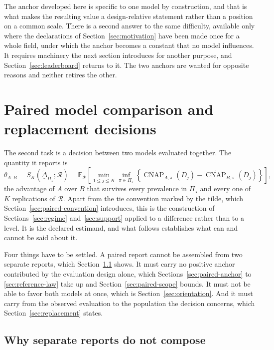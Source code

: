 \documentclass[11pt]{article}
\newcommand{\CNAP}{\operatorname{CNAP}}
\newcommand{\Regime}{\mathcal{R}}
\newcommand{\PSet}{\Pi_\star}
\newcommand{\E}{\mathbb{E}}
\newcommand{\CNAPta}{\widetilde{\CNAP}}
\newcommand{\RobDta}{\underline{\widetilde{\Delta}}_{\PSet}}
\theoremstyle{remark}
\begin{document}
The anchor developed here is specific to one model by construction, and that is what makes the resulting value a design-relative statement rather than a position on a common scale. There is a second answer to the same difficulty, available only where the declarations of Section~\ref{sec:motivation} have been made once for a whole field, under which the anchor becomes a constant that no model influences. It requires machinery the next section introduces for another purpose, and Section~\ref{sec:leaderboard} returns to it. The two anchors are wanted for opposite reasons and neither retires the other.

\section{Paired model comparison and replacement decisions}
\label{sec:paired}

The second task is a decision between two models evaluated together. The quantity it reports is
\begin{equation}
\theta_{A:B}
=
S_K(\RobDta;\Regime)
=
\E_{\Regime}
\left[
\min_{1\leq j\leq K}
\inf_{\pi\in\PSet}
\left\{
\CNAPta_{A,\pi}(D_j)
-
\CNAPta_{B,\pi}(D_j)
\right\}
\right],
\label{eq:robust-paired-support}
\end{equation}
the advantage of $A$ over $B$ that survives every prevalence in $\PSet$ and every one of $K$ replications of $\Regime$. Apart from the tie convention marked by the tilde, which Section~\ref{sec:paired-convention} introduces, this is the construction of Sections~\ref{sec:regime} and~\ref{sec:support} applied to a difference rather than to a level. It is the declared estimand, and what follows establishes what can and cannot be said about it.

Four things have to be settled. A paired report cannot be assembled from two separate reports, which Section~\ref{sec:marginal} shows. It must carry no positive anchor contributed by the evaluation design alone, which Sections~\ref{sec:paired-anchor} to \ref{sec:reference-law} take up and Section~\ref{sec:paired-scope} bounds. It must not be able to favor both models at once, which is Section~\ref{sec:orientation}. And it must carry from the observed evaluation to the population the decision concerns, which Section~\ref{sec:replacement} states.

\subsection{Why separate reports do not compose}
\label{sec:marginal}
\end{document}
